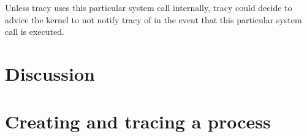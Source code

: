 \documentclass[a4paper, 10pt]{report}
\begin{document}
Unless tracy uses this particular system call internally, tracy could decide
to advice the kernel to not notify tracy of in the event that this particular
system call is executed.





% 



\chapter{Discussion}




\pagebreak

\appendix
\addappheadtotoc

\chapter{Creating and tracing a process}
\label{appendix:createtrace}
\end{document}
